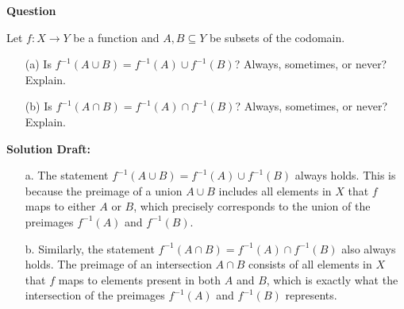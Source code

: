 \documentclass{article}
\begin{document}
\vspace{0.5cm} %

\noindent\textbf{Question}

Let \( f : X \to Y \) be a function and \( A, B \subseteq Y \) be subsets of the codomain.
\begin{enumerate}
    \item[(a)] Is \( f^{-1}(A \cup B) = f^{-1}(A) \cup f^{-1}(B) \)? Always, sometimes, or never? Explain.
    \item[(b)] Is \( f^{-1}(A \cap B) = f^{-1}(A) \cap f^{-1}(B) \)? Always, sometimes, or never? Explain.
\end{enumerate}

\noindent\textbf{Solution Draft:} 

\begin{enumerate}
\item[a.]
The statement \( f^{-1}(A \cup B) = f^{-1}(A) \cup f^{-1}(B) \) always holds. This is because the preimage of a union \( A \cup B \) includes all elements in \( X \) that \( f \) maps to either \( A \) or \( B \), which precisely corresponds to the union of the preimages \( f^{-1}(A) \) and \( f^{-1}(B) \).

\item[b.]
Similarly, the statement \( f^{-1}(A \cap B) = f^{-1}(A) \cap f^{-1}(B) \) also always holds. The preimage of an intersection \( A \cap B \) consists of all elements in \( X \) that \( f \) maps to elements present in both \( A \) and \( B \), which is exactly what the intersection of the preimages \( f^{-1}(A) \) and \( f^{-1}(B) \) represents.
\end{enumerate}
\end{document}
